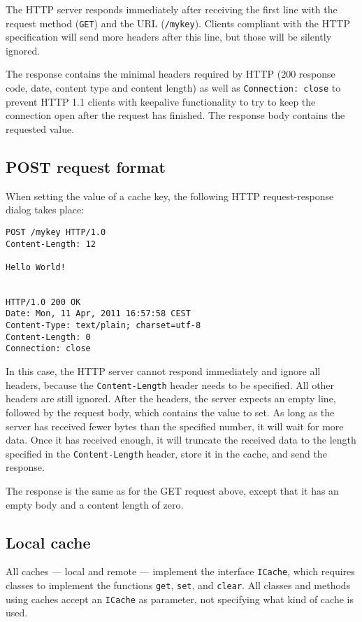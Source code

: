 \documentclass[11pt]{article}
\begin{document}
The HTTP server responds immediately after receiving the first line with the
request method (\lstinline!GET!) and the URL (\lstinline!/mykey!). Clients
compliant with the HTTP specification will send more headers after this line,
but those will be silently ignored.

The response contains the minimal headers required by HTTP (200 response code,
date, content type and content length) as well as \lstinline!Connection: close!
to prevent HTTP 1.1 clients with keepalive functionality to try to keep the
connection open after the request has finished. The response body contains
the requested value.

\subsection*{POST request format}
When setting the value of a cache key, the following HTTP request-response
dialog takes place:

\begin{lstlisting}
POST /mykey HTTP/1.0
Content-Length: 12

Hello World!


HTTP/1.0 200 OK
Date: Mon, 11 Apr, 2011 16:57:58 CEST
Content-Type: text/plain; charset=utf-8
Content-Length: 0
Connection: close
\end{lstlisting}

In this case, the HTTP server cannot respond immediately and ignore all headers,
because the \lstinline!Content-Length! header needs to be specified. All other
headers are still ignored. After the headers, the server expects an empty line,
followed by the request body, which contains the value to set. As long as the
server has received fewer bytes than the specified number, it will wait for
more data. Once it has received enough, it will truncate the received data
to the length specified in the \lstinline!Content-Length! header, store it
in the cache, and send the response.

The response is the same as for the GET request above, except that it has an
empty body and a content length of zero.

\subsection*{Local cache}
All caches --- local and remote --- implement the interface \texttt{ICache}, which requires classes to implement the functions \texttt{get}, \texttt{set}, and \texttt{clear}. All classes and methods using caches accept an \texttt{ICache} as parameter, not specifying what kind of cache is used.
\end{document}
